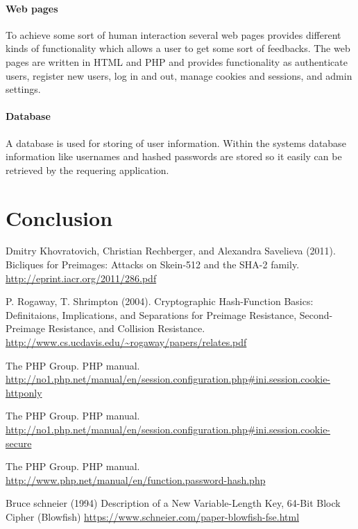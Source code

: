 \documentclass[11pt, a4paper]{article}
\begin{document}
\paragraph{Web pages}
To achieve some sort of human interaction several web pages provides different kinds of functionality which allows a user to get some sort of feedbacks. The web pages are written in HTML and PHP and provides functionality as authenticate users, register new users, log in and out, manage cookies and sessions, and admin settings.
\paragraph{Database}
A database is used for storing of user information. Within the systems database information like usernames and hashed passwords are stored so it easily can be retrieved by the requering application.
 
\section{Conclusion}

\begin{thebibliography}{9}

    Dmitry Khovratovich, Christian Rechberger, and Alexandra Savelieva (2011).
    Bicliques for Preimages: Attacks on Skein-512 and the SHA-2 family.
    \url{http://eprint.iacr.org/2011/286.pdf}

    P. Rogaway, T. Shrimpton (2004).
    Cryptographic Hash-Function Basics: Definitaions, Implications, and Separations for Preimage Resistance, Second-Preimage Resistance, and Collision Resistance.
    \url{http://www.cs.ucdavis.edu/~rogaway/papers/relates.pdf}

    The PHP Group.
    PHP manual.
    \url{http://no1.php.net/manual/en/session.configuration.php#ini.session.cookie-httponly}
    
    The PHP Group.
    PHP manual.
    \url{http://no1.php.net/manual/en/session.configuration.php#ini.session.cookie-secure}

    The PHP Group.
    PHP manual.
    \url{http://www.php.net/manual/en/function.password-hash.php}

    Bruce schneier (1994)
    Description of a New Variable-Length Key, 64-Bit Block Cipher (Blowfish)
    \url{https://www.schneier.com/paper-blowfish-fse.html}

\end{thebibliography}
\end{document}
